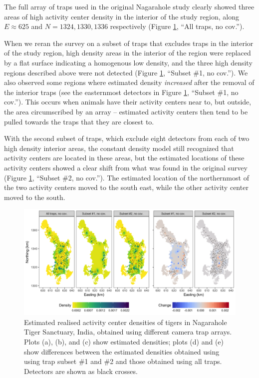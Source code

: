 \documentclass[10pt,a4paper]{article}
\begin{document}
The full array of traps used in the original Nagarahole study clearly showed three areas of high activity center density in the interior of the study region, along $E\approx 625$ and $N=1324, 1330, 1336$ respectively (Figure \ref{tigernocov}, ``All traps, no cov.''). 

When we reran the survey on a subset of traps that excludes traps in the interior of the study region, high density areas in the interior of the region were replaced by a flat surface indicating a homogenous low density, and the three high density regions described above were not detected  (Figure \ref{tigernocov}, ``Subset \#1, no cov.''). We also observed some regions where estimated density {\it increased} after the removal of the interior traps (see the easternmost detectors in Figure \ref{tigernocov}, ``Subset \#1, no cov.''). This occurs when animals have their activity centers near to, but outside, the area circumscribed by an array -- estimated activity centers then tend to be pulled towards the traps that they are closest to. 

With the second subset of traps, which exclude eight detectors from each of two high density interior areas, the constant density model still recognized that activity centers are located in these areas, but the estimated locations of these activity centers showed a clear shift from what was found in the original survey (Figure \ref{tigernocov}, ``Subset \#2, no cov.''). The estimated location of the northernmost of the two activity centers moved to the south east, while the other activity center moved to the south.

\begin{figure}[htbp]
\centering
\includegraphics[width=1\textwidth]{tiger_surfaces_nocovs.png}
\caption{Estimated realised activity center densities of tigers in Nagarahole Tiger Sanctuary, India, obtained using different camera trap arrays. Plots (a), (b), and (c) show estimated densities; plots (d) and (e) show differences between the estimated densities obtained using using trap subset \#1 and \#2 and those obtained using all traps. Detectors are shown as black crosses.}
\label{tigernocov}
\end{figure}
\end{document}
